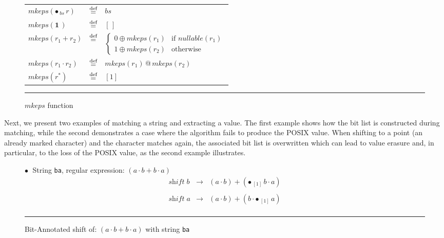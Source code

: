 \documentclass[12pt]{article}
\makeatletter
\newcommand{\dn}{\ensuremath{\stackrel{\mbox{\scriptsize def}}{=}}}
\newcommand{\ONE}{\textbf{1}}
\newcommand{\shift}{\textit{shift}}
\newcommand{\mkeps}{\textit{mkeps}}
\newcommand{\Marked}[1]{\bullet\,#1}
\newcommand{\nullable}{\textit{nullable}}
\newcommand{\emptylist}{[\,]}
\newcommand{\At}{$\,@\,$}
\makeatother
\begin{document}
\begin{figure}[ht]
  \begin{center}
    \renewcommand{\arraystretch}{1.5}
    \begin{tabular}{lcl}
      $\mkeps(\Marked{_{bs}\,r})$            & \dn & $bs$ \\
      $\mkeps(\ONE\,)$                       & \dn & $\emptylist$ \\
      $\mkeps(r_1 + r_2)$                    & \dn &
        $\begin{cases}
          0 \oplus \mkeps(r_1) & \text{if } \nullable(r_1) \\
          1 \oplus \mkeps(r_2) & \text{otherwise}
        \end{cases}$ \\
      $\mkeps(r_1 \cdot r_2)$                & \dn & $\mkeps(r_1) \At \mkeps(r_2)$ \\
      $\mkeps(r^*)$                          & \dn & $[1]$
    \end{tabular}
    \renewcommand{\arraystretch}{1.0}

    \mbox{}
    \rule{\linewidth}{0.4pt}
    \caption{$\mkeps$ function}\label{mkepsBit1Function}
  \end{center}
\end{figure}
\FloatBarrier
Next, we present two examples of matching a string and extracting a value.  
The first example shows how the bit list is constructed during matching,  
while the second demonstrates a case where the algorithm fails to produce the POSIX value.
When shifting to a point (an already marked character) and the character matches again, the associated 
bit list is overwritten which can lead to value erasure and, in particular, to the loss of the POSIX value,  
as the second example illustrates.  


  \begin{figure}[ht]
    $\bullet\;$ String \texttt{ba}, regular expression: $(a \cdot b + b \cdot a)$
    \[
    \begin{array}{rcl}
      \shift\; b & \rightarrow & (a \cdot b) + (\Marked{_{[1]}\, b} \cdot a)\\\\
      \shift\; a & \rightarrow & (a \cdot b) + (b \cdot \Marked{_{[1]}\, a} )\\
    \end{array}
    \]
    \hrule

    \caption{Bit-Annotated shift of: $(a \cdot b + b \cdot a)$ with string \texttt{ba}} \label{BitAnnotatedShiftExample1}
    \mbox{}

  \end{figure}
      
\end{document}
